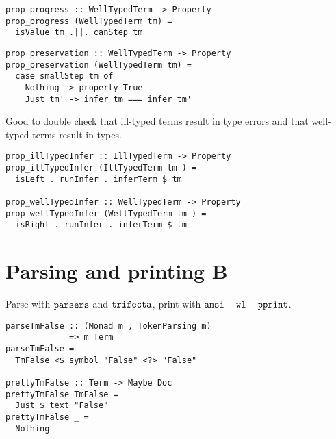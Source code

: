 \documentclass[aspectration=169]{beamer}
\begin{document}
\begin{frame}[fragile]
  \begin{verbatim}
prop_progress :: WellTypedTerm -> Property
prop_progress (WellTypedTerm tm) =
  isValue tm .||. canStep tm
  \end{verbatim}
\end{frame} 

\begin{frame}[fragile]
  \begin{verbatim}
prop_preservation :: WellTypedTerm -> Property
prop_preservation (WellTypedTerm tm) =
  case smallStep tm of
    Nothing -> property True
    Just tm' -> infer tm === infer tm'
  \end{verbatim}
\end{frame} 

\begin{frame}[fragile]
  \begin{center}
   Good to double check that ill-typed terms result in type errors and that well-typed terms
   result in types.
  \end{center}
  \begin{verbatim}
prop_illTypedInfer :: IllTypedTerm -> Property
prop_illTypedInfer (IllTypedTerm tm ) =
  isLeft . runInfer . inferTerm $ tm

prop_wellTypedInfer :: WellTypedTerm -> Property
prop_wellTypedInfer (WellTypedTerm tm ) =
  isRight . runInfer . inferTerm $ tm
  \end{verbatim}
\end{frame} 

\section{Parsing and printing B}

\begin{frame}[c]
  \begin{center}
Parse with $\tt{parsers}$ and $\tt{trifecta}$, print with $\tt{ansi-wl-pprint}$.
  \end{center}
\end{frame}

\begin{frame}[fragile]
  \begin{verbatim}
parseTmFalse :: (Monad m , TokenParsing m)
             => m Term           
parseTmFalse =
  TmFalse <$ symbol "False" <?> "False"

prettyTmFalse :: Term -> Maybe Doc
prettyTmFalse TmFalse =
  Just $ text "False"
prettyTmFalse _ =
  Nothing
  \end{verbatim}
\end{frame} 
\end{document}
